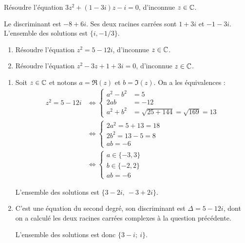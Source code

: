 \begin{exo}%
Résoudre l'équation $3z^2 +(1-3i)z-i =0$, d'inconnue $z\in \mathbb{C}$.
\begin{sol}
Le discriminant est $-8+6i$. Ses deux racines carrées sont $1+3i$ et $-1-3i$. L'ensemble des solutions est $\{i,-1/3\}$.
\end{sol}
\end{exo}



\begin{exo}
\begin{enumerate}
\item Résoudre l'équation $z^2=5-12i$, d'inconnue $z\in \mathbb{C}$.
\item Résoudre l'équation $z^2-3z+1+3i=0$, d'inconnue $z\in \mathbb{C}$.
\end{enumerate}
\begin{sol}
\begin{enumerate}
\item Soit $z\in \mathbb{C}$ et notons $a=\Re(z)$ et $b=\Im(z)$. On a les équivalences : 
\begin{align*}
z^2 =5-12i
&\iff \begin{cases}a^2-b^2&= 5\\
2ab&= -12\\
 a^2+b^2&=\sqrt{25+144}=\sqrt{169}=13\end{cases}\\
&\iff \begin{cases}2a^2=5+13=18\\ 2b^2=13-5=8\\ab=-6\end{cases}\\
&\iff \begin{cases}a\in \{-3,3\}\\b\in \{-2,2\}\\ab=-6\end{cases}
\end{align*}
\begin{mdframed}L'ensemble des solutions est $\{3-2i, \: -3+2i\}$.\end{mdframed}
\item C'est une équation du second degré, son discriminant est $\Delta=5-12i$, dont on a calculé les deux racines carrées complexes à la question précédente. \begin{mdframed}L'ensemble des solutions est donc
$\{3-i;\: i\}$.\end{mdframed}
\end{enumerate}
\end{sol}
\end{exo}


